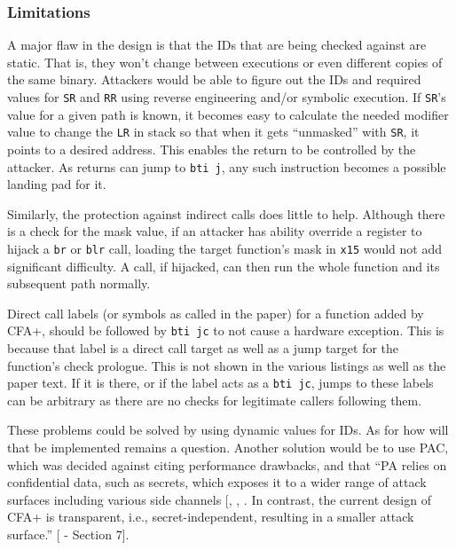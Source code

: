 \documentclass[a4paper, nobind]{templates/ociamthesis}
\begin{document}
\subsubsection{Limitations}\label{limitations-1}

A major flaw in the design is that the IDs that are being checked against are static.
That is, they won't change between executions or even different copies of the same binary.
Attackers would be able to figure out the IDs and required values for \texttt{SR} and \texttt{RR} using
reverse engineering and/or symbolic execution. If \texttt{SR}'s value for a given path
is known, it becomes easy to calculate the needed modifier value to change the
\texttt{LR} in stack so that when it gets ``unmasked'' with \texttt{SR}, it points to a desired address.
This enables the return to be controlled by the attacker. As returns can jump to \texttt{bti\ j},
any such instruction becomes a possible landing pad for it.

Similarly, the protection against indirect calls does little to help. Although
there is a check for the mask value, if an attacker has ability override a register to
hijack a \texttt{br} or \texttt{blr} call, loading the target function's mask in \texttt{x15} would not
add significant difficulty. A call, if hijacked, can then run the whole function
and its subsequent path normally.

Direct call labels (or symbols as called in the paper) for a function added by CFA+,
should be followed by \texttt{bti\ jc} to not cause a hardware exception.
This is because that label is a direct call target as well as a jump target for
the function's check prologue. This is not shown in the various listings as well as the paper text.
If it is there, or if the label acts as a \texttt{bti\ jc}, jumps to these labels can be
arbitrary as there are no checks for legitimate callers following them.

These problems could be solved by using dynamic values for IDs. As for how will that
be implemented remains a question. Another solution would be to use PAC, which
was decided against citing performance drawbacks, and that ``PA relies on confidential
data, such as secrets, which exposes it to a wider range of attack surfaces including
various side channels {[}, , \citeproc{ref-ravichandran2022pacman}{45}{]}.
In contrast, the current design of CFA+ is transparent, i.e.,
secret-independent, resulting in a smaller attack surface.'' {[} - Section 7{]}.
\end{document}
